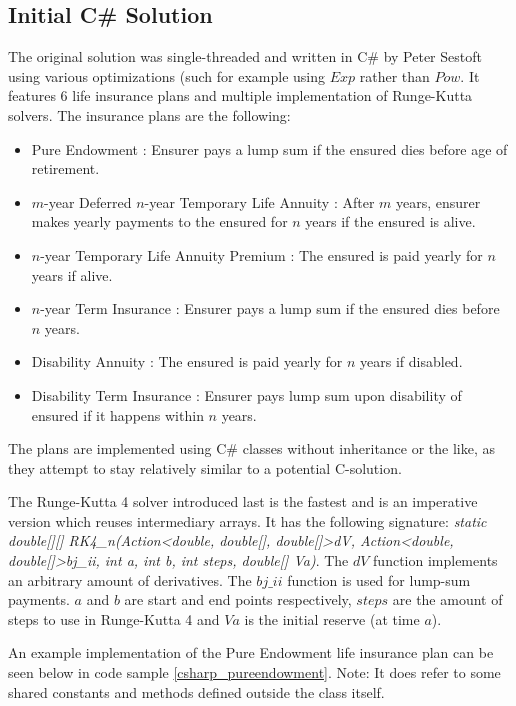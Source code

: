 \subsection{Initial C\# Solution}
The original solution was single-threaded and written in C\# by Peter Sestoft using various optimizations (such for example using $Exp$ rather than $Pow$. 
It features 6 life insurance plans and multiple implementation of Runge-Kutta solvers. 
The insurance plans are the following:
\begin{itemize}
\item Pure Endowment : Ensurer pays a lump sum if the ensured dies before age of retirement. 
\item $m$-year Deferred $n$-year Temporary Life Annuity : After $m$ years, ensurer makes yearly payments to the ensured for $n$ years if the ensured is alive.
\item $n$-year Temporary Life Annuity Premium : The ensured is paid yearly for $n$ years if alive.
\item $n$-year Term Insurance : Ensurer pays a lump sum if the ensured dies before $n$ years.
\item Disability Annuity : The ensured is paid yearly for $n$ years if disabled.
\item Disability Term Insurance : Ensurer pays lump sum upon disability of ensured if it happens within $n$ years.
\end{itemize}

The plans are implemented using C\# classes without inheritance or the like, as they attempt to stay relatively similar to a potential C-solution.

The Runge-Kutta 4 solver introduced last is the fastest and is an imperative version which reuses intermediary arrays.
It has the following signature: \textit{static double[][] RK4\_n(Action\textless double, double[], double[]\textgreater  dV, Action\textless double, double[]\textgreater  bj\_ii, int a, int b, int steps, double[] Va)}.
The $dV$ function implements an arbitrary amount of derivatives.
The $bj\_ii$ function is used for lump-sum payments.
$a$ and $b$ are start and end points respectively, $steps$ are the amount of steps to use in Runge-Kutta 4 and $Va$ is the initial reserve (at time $a$).

An example implementation of the Pure Endowment life insurance plan can be seen below in code sample \ref{csharp_pureendowment}. 
Note: It does refer to some shared constants and methods defined outside the class itself.

